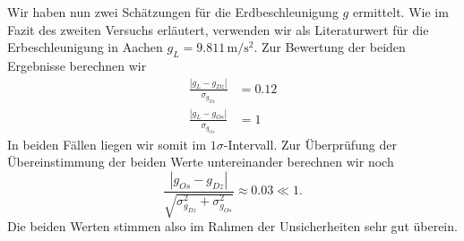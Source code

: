 \documentclass[a4paper, 12pt]{scrartcl}
\begin{document}
Wir haben nun zwei Schätzungen für die Erdbeschleunigung $g$ ermittelt. Wie im Fazit des zweiten Versuchs erläutert, verwenden wir als Literaturwert für die Erbeschleunigung in Aachen $g_L = 9.811 \, \mathrm m / \mathrm s^2$. 
Zur Bewertung der beiden Ergebnisse berechnen wir
\begin{align*}
\frac{|g_L-g_{Dz}|}{\sigma_{g_{Dz}}} &= 0.12 \\
\frac{|g_L-g_{Os}|}{\sigma_{g_{Os}}} &= 1
\end{align*}
In beiden Fällen liegen wir somit im $1\sigma$-Intervall. Zur Überprüfung der Übereinstimmung der beiden Werte untereinander berechnen wir noch
$$\frac{|g_{Os}-g_{Dz}|}{\sqrt{\sigma_{g_{Dz}}^2 + \sigma_{g_{Os}}^2}} \approx 0.03 \ll 1.$$
Die beiden Werten stimmen also im Rahmen der Unsicherheiten sehr gut überein. 


\newpage
\end{document}
